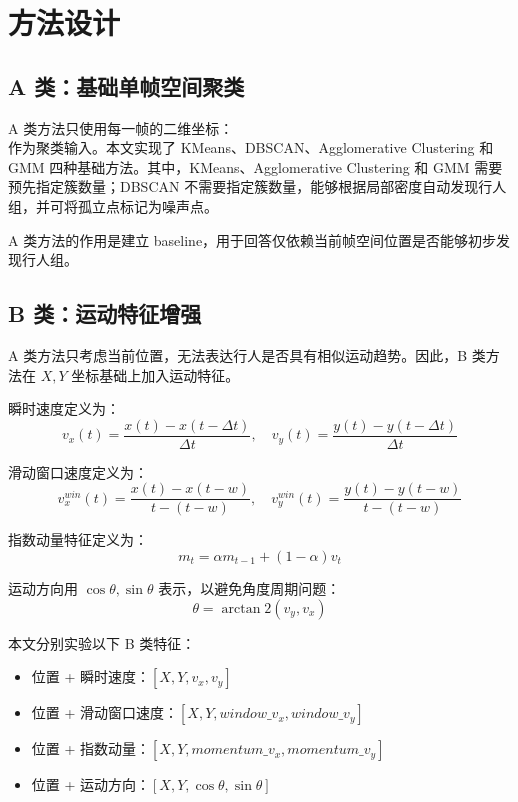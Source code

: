 \documentclass[UTF8,a4paper,12pt]{ctexart}
\begin{document}
\section{方法设计}

\subsection{A 类：基础单帧空间聚类}

A 类方法只使用每一帧的二维坐标：
\begin{equation}
[X, Y]
\end{equation}
作为聚类输入。本文实现了 KMeans、DBSCAN、Agglomerative Clustering 和 GMM 四种基础方法。其中，KMeans、Agglomerative Clustering 和 GMM 需要预先指定簇数量；DBSCAN 不需要指定簇数量，能够根据局部密度自动发现行人组，并可将孤立点标记为噪声点。

A 类方法的作用是建立 baseline，用于回答仅依赖当前帧空间位置是否能够初步发现行人组。

\subsection{B 类：运动特征增强}

A 类方法只考虑当前位置，无法表达行人是否具有相似运动趋势。因此，B 类方法在 $X,Y$ 坐标基础上加入运动特征。

瞬时速度定义为：
\begin{equation}
v_x(t)=\frac{x(t)-x(t-\Delta t)}{\Delta t},\quad
v_y(t)=\frac{y(t)-y(t-\Delta t)}{\Delta t}
\end{equation}

滑动窗口速度定义为：
\begin{equation}
v_x^{win}(t)=\frac{x(t)-x(t-w)}{t-(t-w)},\quad
v_y^{win}(t)=\frac{y(t)-y(t-w)}{t-(t-w)}
\end{equation}

指数动量特征定义为：
\begin{equation}
m_t=\alpha m_{t-1}+(1-\alpha)v_t
\end{equation}

运动方向用 $\cos\theta,\sin\theta$ 表示，以避免角度周期问题：
\begin{equation}
\theta=\arctan2(v_y,v_x)
\end{equation}

本文分别实验以下 B 类特征：

\begin{itemize}
    \item 位置 + 瞬时速度：$[X,Y,v_x,v_y]$
    \item 位置 + 滑动窗口速度：$[X,Y,window\_v_x,window\_v_y]$
    \item 位置 + 指数动量：$[X,Y,momentum\_v_x,momentum\_v_y]$
    \item 位置 + 运动方向：$[X,Y,\cos\theta,\sin\theta]$
\end{itemize}
\end{document}
